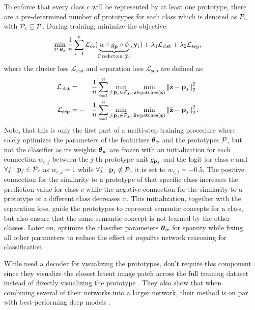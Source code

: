 To enforce that every class $c$ will be represented by at least one prototype, there are a pre-determined number of prototypes for each class which is denoted as $\mathcal{P}_c$ with $\mathcal{P}_c \subseteq \mathcal{P}$. During training, \citet{ChenLTBRS19} minimize the objective:
\begin{equation}
\label{eq:min_prototypes}
    \min_{\mathcal{P}, \boldsymbol{\theta}_\phi} \frac{1}{n} \sum_{i=1}^n \mathcal{L}_{\mathrm{ce}}(\underbrace{w \circ g_{\mathbf{p}} \circ \phi}_{\text{Prediction}\ \hat{\mathbf{y}}_{i}}, \mathbf{y}_i) + \lambda_1 \mathcal{L}_{\mathrm{clst}} + \lambda_2 \mathcal{L}_{\mathrm{sep}},
\end{equation}
where the cluster loss $\mathcal{L}_{\mathrm{clst}}$ and separation loss $\mathcal{L}_{\mathrm{sep}}$ are defined as:
\begin{alignat}{3}
\label{eq:prototype_losses}
    \mathcal{L}_{\mathrm{clst}} &= &&\frac{1}{n} \sum_{i=1}^n \min_{j: \mathbf{p}_{j} \in \mathcal{P}_{\mathbf{y}_i}} \min_{\Bar{\mathbf{z}} \in \text{patches}(\mathbf{z})} \left\|\Bar{\mathbf{z}} - \mathbf{p}_{j}\right\|^2_2\\
    \mathcal{L}_{\mathrm{sep}} &= -&&\frac{1}{n} \sum_{i=1}^n \min_{j: \mathbf{p}_{j} \notin \mathcal{P}_{\mathbf{y}_i}} \min_{\Bar{\mathbf{z}} \in \text{patches}(\mathbf{z})} \left\|\Bar{\mathbf{z}} - \mathbf{p}_{j}\right\|^2_2.
\end{alignat}
Note, that this is only the first part of a multi-step training procedure where  solely optimizes the parameters of the featurizer $\boldsymbol{\theta}_\phi$ and the prototypes $\mathcal{P}$, but not the classifier as its weights $\boldsymbol{\theta}_w$ are frozen with an initialization for each connection $w_{c,j}$ between the $j$-th prototype unit $g_{\mathbf{p}_{j}}$ and the logit for class $c$ and $\forall j: \mathbf{p}_{j} \in \mathcal{P}_c$ as $w_{c,j} = 1$ while $\forall j: \mathbf{p}_{j} \notin \mathcal{P}_c$ it is set to $w_{c,j} = -0.5$. The positive connection for the similarity to a prototype of that specific class increases the prediction value for class $c$ while the negative connection for the similarity to a prototype of a different class decreases it. This initialization, together with the separation loss, guide the prototypes to represent semantic concepts for a class, but also ensure that the same semantic concept is not learned by the other classes. Later on, \citet{ChenLTBRS19} optimize the classifier parameters $\boldsymbol{\theta}_w$  for sparsity while fixing all other parameters to reduce the effect of \emph{negative} network reasoning for classification. 

While \citet{LiLCR18} need a decoder for visualizing the prototypes, \citet{ChenLTBRS19} don't require this component since they visualize the closest latent image patch across the full training dataset instead of directly visualizing the prototype \citep{ChenLTBRS19}. They also show that when combining several of their networks into a larger network, their method is on par with best-performing deep models \citep{ChenLTBRS19}.


